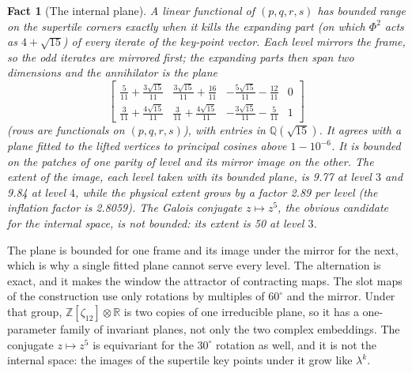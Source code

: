 \documentclass[11pt]{article}
\newtheorem{fact}{Fact}
\theoremstyle{definition}
\theoremstyle{remark}
\newcommand{\lam}{\lambda}
\begin{document}
\begin{fact}[The internal plane]
\label{fact:plane}
A linear functional of $(p,q,r,s)$ has bounded range on the supertile corners exactly when it kills the expanding part
(on which $\Phi^{2}$ acts as $4+\sqrt{15}$) of every iterate of the key-point vector.  Each level mirrors the frame, so the odd iterates
are mirrored first; the expanding parts then span two dimensions and the annihilator is the plane
\[
\left[\begin{matrix}\frac{5}{11} + \frac{3 \sqrt{15}}{11} & \frac{3 \sqrt{15}}{11} + \frac{16}{11} & - \frac{5 \sqrt{15}}{11} - \frac{12}{11} & 0\\\frac{3}{11} + \frac{4 \sqrt{15}}{11} & \frac{3}{11} + \frac{4 \sqrt{15}}{11} & - \frac{3 \sqrt{15}}{11} - \frac{5}{11} & 1\end{matrix}\right]
\]
(rows are functionals on $(p,q,r,s)$), with entries in $\mathbb{Q}(\sqrt{15})$.  It agrees with a plane fitted to the
lifted vertices to principal cosines above $1-10^{-6}$.  It is bounded on the patches of one parity of level and its mirror
image on the other.  The extent of the image, each level taken with its bounded plane, is 9.77 at level $3$ and 9.84 at
level $4$, while the physical extent grows by a factor 2.89 per level (the inflation factor is 2.8059).  The Galois
conjugate $z\mapsto z^{5}$, the obvious candidate for the internal space, is not bounded: its extent is 50 at level $3$.
\end{fact}

\noindent
The plane is bounded for one frame and its image under the mirror for the next, which is why a single fitted plane
cannot serve every level.  The alternation is exact, and it makes the window the attractor of contracting maps.  The slot
maps of the construction use only rotations by multiples of $60^{\circ}$ and the mirror.  Under that group,
$\mathbb{Z}[\zeta_{12}]\otimes\mathbb{R}$ is two copies of one irreducible plane, so it has a one-parameter family of
invariant planes, not only the two complex embeddings.  The conjugate $z\mapsto z^{5}$ is equivariant for the $30^{\circ}$
rotation as well, and it is not the internal space: the images of the supertile key points under it grow like $\lam^{k}$.
\end{document}

